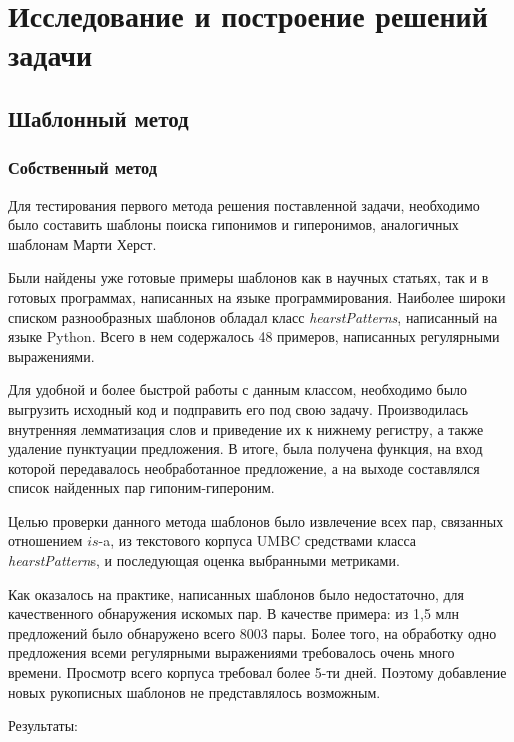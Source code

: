 \section{Исследование и построение решений задачи}
\label{sec:Chapter_4} 
\large




\subsection{Шаблонный метод}

\subsubsection{Собственный метод}

Для тестирования первого метода решения поставленной задачи, необходимо
было составить шаблоны поиска гипонимов и гиперонимов, аналогичных шаблонам
Марти Херст.

Были найдены уже готовые примеры шаблонов как в научных статьях, так и в
готовых программах, написанных на языке программирования. Наиболее широки
списком разнообразных шаблонов обладал класс \newline
\textit{hearstPatterns}, написанный на
языке Python. Всего в нем содержалось 48 примеров, написанных регулярными
выражениями.

Для удобной и более быстрой работы с данным классом, необходимо было
выгрузить исходный код и подправить его под свою задачу. Производилась
внутренняя лемматизация слов и приведение их к нижнему регистру, а также
удаление пунктуации предложения. В итоге, была получена функция, на вход
которой передавалось необработанное предложение, а на выходе составлялся
список найденных пар гипоним-гипероним.

Целью проверки данного метода шаблонов было извлечение всех пар, связанных
отношением $is$-a, из текстового корпуса UMBC средствами класса \textit{hearstPattern}s, и
последующая оценка выбранными метриками.

Как оказалось на практике, написанных шаблонов было недостаточно, для
качественного обнаружения искомых пар. В качестве примера: из 1,5 млн
предложений было обнаружено всего 8003 пары. Более того, на обработку одно
предложения всеми регулярными выражениями требовалось очень много времени.
Просмотр всего корпуса требовал более 5-ти дней. Поэтому добавление новых
рукописных шаблонов не представлялось возможным.

Результаты:

